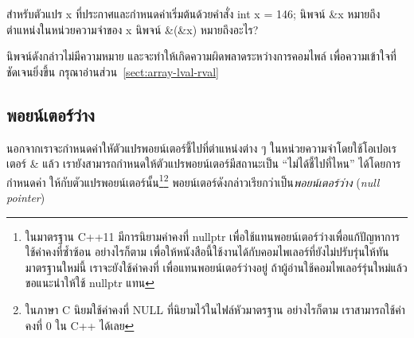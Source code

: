\begin{quiz}{}
สำหรับ{\wbr}ตัวแปร {\ct x} ที่{\wbr}ประกาศ{\wbr}และ{\wbr}กำหนด{\wbr}ค่า{\wbr}เริ่มต้น{\wbr}ด้วย{\wbr}คำสั่ง {\ct int x = 146;}
นิพจน์ {\ct \&x} หมายถึง{\wbr}ตำแหน่ง{\wbr}ใน{\wbr}หน่วยความจำ{\wbr}ของ {\ct x} นิพจน์ {\ct \&(\&x)} หมายถึง{\wbr}อะไร?
\end{quiz}
\begin{quizans}
นิพจน์{\wbr}ดังกล่าว{\wbr}ไม่{\wbr}มี{\wbr}ความหมาย และ{\wbr}จะ{\wbr}ทำ{\wbr}ให้{\wbr}เกิด{\wbr}ความผิด{\wbr}พลาด{\wbr}ระหว่าง{\wbr}การ{\wbr}คอมไพล์{\wbr}
เพื่อ{\wbr}ความ{\wbr}เข้าใจ{\wbr}ที่{\wbr}ชัดเจน{\wbr}ยิ่ง{\wbr}ขึ้น กรุณา{\wbr}อ่าน{\wbr}ส่วน~\ref{sect:array-lval-rval}
\end{quizans}

\subsection{พอยน์เตอร์{\wbr}ว่าง}
นอกจาก{\wbr}เรา{\wbr}จะ{\wbr}กำหนด{\wbr}ค่า{\wbr}ใหัตัว{\wbr}แปร{\wbr}พอยน์เตอร์{\wbr}ชี้{\wbr}ไป{\wbr}ที่{\wbr}ตำแหน่ง{\wbr}ต่าง ๆ
ใน{\wbr}หน่วยความจำ{\wbr}โดย{\wbr}ใช้{\wbr}โอ{\wbr}เปอเรเตอร์ {\ct\&} แล้ว{\wbr}
เรา{\wbr}ยัง{\wbr}สามารถ{\wbr}กำหนด{\wbr}ให้{\wbr}ตัวแปร{\wbr}พอยน์เตอร์{\wbr}มี{\wbr}สถานะ{\wbr}เป็น ``ไม่{\wbr}ได้{\wbr}ชี้{\wbr}ไป{\wbr}ที่ไหน''
ได้{\wbr}โดย{\wbr}การ{\wbr}กำหนด{\wbr}ค่า {} ให้{\wbr}กับ{\wbr}ตัวแปร{\wbr}พอยน์เตอร์{\wbr}นั้น\footnote{ใน{\wbr}มาตรฐาน C++11
  มี{\wbr}การ{\wbr}นิยาม{\wbr}ค่าคงที่ {\ct nullptr}
  เพื่อ{\wbr}ใช้{\wbr}แทน{\wbr}พอยน์เตอร์{\wbr}ว่าง{\wbr}เพื่อ{\wbr}แก้{\wbr}ปัญหา{\wbr}การ{\wbr}ใช้{\wbr}ค่าคงที่{\wbr}ซ้ำซ้อน อย่างไรก็ตาม{\wbr}
  เพื่อให้{\wbr}หนังสือ{\wbr}นี้{\wbr}ใช้{\wbr}งาน{\wbr}ได้{\wbr}กับ{\wbr}คอม{\wbr}ไพ{\wbr}เลอร์{\wbr}ที่{\wbr}ยัง{\wbr}ไม่{\wbr}ปรับ{\wbr}รุ่น{\wbr}ให้{\wbr}ทัน{\wbr}มาตรฐาน{\wbr}ใหม่{\wbr}นี้{\wbr}
  เรา{\wbr}จะ{\wbr}ยัง{\wbr}ใช้{\wbr}ค่าคงที่ {} เพื่อ{\wbr}แทน{\wbr}พอยน์เตอร์{\wbr}ว่าง{\wbr}อยู่ ถ้า{\wbr}ผู้อ่าน{\wbr}ใช้{\wbr}คอม{\wbr}ไพ{\wbr}เลอร์{\wbr}รุ่น{\wbr}ใหม่{\wbr}แล้ว{\wbr}
  ขอ{\wbr}แนะนำ{\wbr}ให้{\wbr}ใช้ {\ct nullptr} แทน {}}\footnote{ใน{\wbr}ภาษา C นิยม{\wbr}ใช้{\wbr}ค่าคงที่{\wbr}
  {\ct NULL} ที่{\wbr}นิยาม{\wbr}ไว้{\wbr}ใน{\wbr}ไฟล์{\wbr}หัว{\wbr}มาตรฐาน อย่างไรก็ตาม เรา{\wbr}สามารถ{\wbr}ใช้{\wbr}ค่าคงที่ 0 ใน{\wbr}
  C++ ได้{\wbr}เลย} พอยน์เตอร์ดังกล่าว{\wbr}เรียก{\wbr}ว่า{\wbr}เป็น{\em พอยน์เตอร์ว่าง} ({\em null
  pointer})

